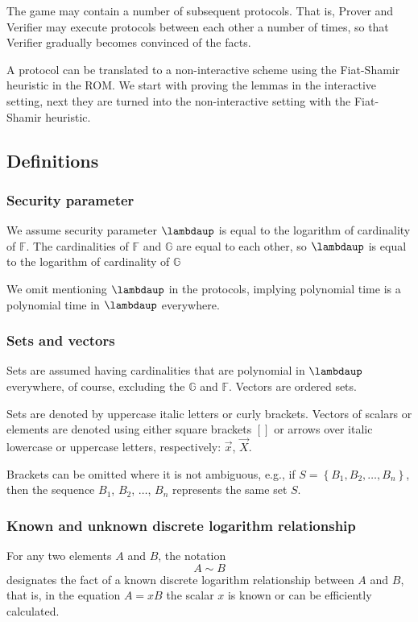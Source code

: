 \documentclass{mathcryptology} %
\theoremstyle{title}
\theoremstyle{titleof}
\begin{document}
    The game may contain a number of subsequent protocols. That is, Prover and Verifier may execute protocols between each other a number of times, so that Verifier gradually becomes convinced of the facts.

    A protocol can be translated to a non-interactive scheme using the Fiat-Shamir heuristic in the ROM. We start with proving the lemmas in the interactive setting, next they are turned into the non-interactive setting with the Fiat-Shamir heuristic.


\subsection{Definitions}


\subsubsection{Security parameter}
    We assume security parameter $\bm{\lambdaup}$ is equal to the logarithm of cardinality of $\mathds{F}$. The cardinalities of $\mathds{F}$ and $\mathds{G}$ are equal to each other, so $\bm{\lambdaup}$ is equal to the logarithm of cardinality of $\mathds{G}$
    
    We omit mentioning $\bm{\lambdaup}$ in the protocols, implying polynomial time is a polynomial time in $\bm{\lambdaup}$ everywhere.     


\subsubsection{Sets and vectors}
    Sets are assumed having cardinalities that are polynomial in $\bm{\lambdaup}$ everywhere, of course, excluding the $\mathds{G}$ and $\mathds{F}$. Vectors are ordered sets.

    Sets are denoted by uppercase italic letters or curly brackets. Vectors of scalars or elements are denoted using either square brackets $[]$ or arrows over italic lowercase or uppercase letters, respectively: $\vec{x}$, $\vec{X}$.

    Brackets can be omitted where it is not ambiguous, e.g., if $S=\left\{ B_{1}, B_{2}, \dots, B_{n}\right\}$, then the sequence $B_{1}$, $B_{2}$, ${\dots}$, $B_{n}$ represents the same set $S$.


\subsubsection{Known and unknown discrete logarithm relationship}
    For any two elements $A$ and $B$, the notation
    \begin{equation*}
        A\sim B
    \end{equation*}
    designates the fact of a known discrete logarithm relationship between $A$ and $B$, that is, in the equation $A=xB$ the scalar $x$ is known or can be efficiently calculated.
\end{document}
